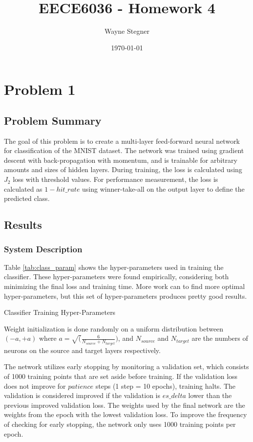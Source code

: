 \documentclass[a4paper, 12pt, titlepage]{article}
\title{EECE6036 - Homework 4}
\author{Wayne Stegner}
\date{\today}
\newcommand{\tabRef}[1]{Table \ref{#1}}
\begin{document}
  \maketitle
  \section{Problem 1}
  \subsection{Problem Summary}
  \par The goal of this problem is to create a multi-layer feed-forward neural
  network for classification of the MNIST dataset.
  The network was trained using gradient descent with back-propagation with
  momentum, and is trainable for arbitrary amounts and sizes of hidden layers.
  During training, the loss is calculated using $J_{2}$ loss with threshold
  values.
  For performance measurement, the loss is calculated as $1 - hit\_rate$ using
  winner-take-all on the output layer to define the predicted class.

  \subsection{Results}
  \subsubsection{System Description}
  \par \tabRef{tab:class_param} shows the hyper-parameters used in training the
  classifier.
  These hyper-parameters were found empirically, considering both minimizing
  the final loss and training time.
  More work can to find more optimal hyper-parameters, but this set of
  hyper-parameters produces pretty good results.
  \begin{table}[htb]
    \centering
    \vspace{-12pt}
    \caption{Classifier Training Hyper-Parameters}
    \vspace{-12pt}
    \label{tab:class_param}
    \vspace{-12pt}
  \end{table}
  \par Weight initialization is done randomly on a uniform distribution between
  $(-a, +a)$ where $a = \sqrt(\frac{6}{N_{source} + N_{target}})$, and
  $N_{source}$ and $N_{target}$ are the numbers of neurons on the source and
  target layers respectively.
  \par The network utilizes early stopping by monitoring a validation set,
  which consists of 1000 training points that are set aside before training.
  If the validation loss does not improve for $patience$ steps (1 step = 10
  epochs), training halts.
  The validation is considered improved if the validation is $es\_delta$ lower
  than the previous improved validation loss.
  The weights used by the final network are the weights from the epoch with the
  lowest validation loss.
  To improve the frequency of checking for early stopping, the network only
  uses 1000 training points per epoch.
\end{document}
